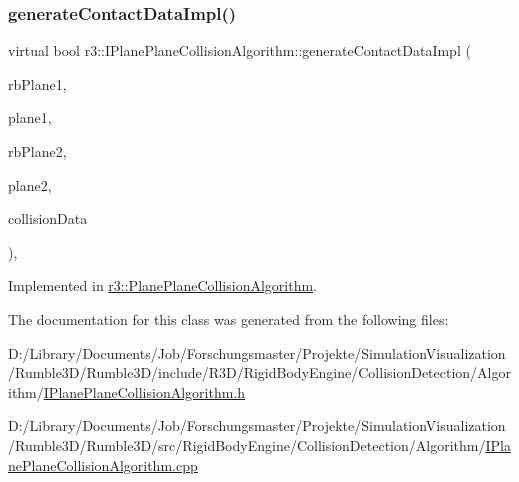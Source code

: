 \mbox{\label{classr3_1_1_i_plane_plane_collision_algorithm_a708dec70f58b4476976dfea9921d1524}} 
\subsubsection{\texorpdfstring{generate\+Contact\+Data\+Impl()}{generateContactDataImpl()}}
{\footnotesize\ttfamily virtual bool r3\+::\+I\+Plane\+Plane\+Collision\+Algorithm\+::generate\+Contact\+Data\+Impl (\begin{DoxyParamCaption}\item[{\mbox{\hyperlink{classr3_1_1_rigid_body}{Rigid\+Body}} $\ast$}]{rb\+Plane1,  }\item[{\mbox{\hyperlink{classr3_1_1_collision_plane}{Collision\+Plane}} $\ast$}]{plane1,  }\item[{\mbox{\hyperlink{classr3_1_1_rigid_body}{Rigid\+Body}} $\ast$}]{rb\+Plane2,  }\item[{\mbox{\hyperlink{classr3_1_1_collision_plane}{Collision\+Plane}} $\ast$}]{plane2,  }\item[{\mbox{\hyperlink{classr3_1_1_collision_data}{Collision\+Data}} \&}]{collision\+Data }\end{DoxyParamCaption})\hspace{0.3cm}{\ttfamily [protected]}, {}}



Implemented in \mbox{\hyperlink{classr3_1_1_plane_plane_collision_algorithm_a33400ba57a8c0550ada0778bb92eeb69}{r3\+::\+Plane\+Plane\+Collision\+Algorithm}}.



The documentation for this class was generated from the following files\+:\begin{DoxyCompactItemize}
\item 
D\+:/\+Library/\+Documents/\+Job/\+Forschungsmaster/\+Projekte/\+Simulation\+Visualization/\+Rumble3\+D/\+Rumble3\+D/include/\+R3\+D/\+Rigid\+Body\+Engine/\+Collision\+Detection/\+Algorithm/\mbox{\hyperlink{_i_plane_plane_collision_algorithm_8h}{I\+Plane\+Plane\+Collision\+Algorithm.\+h}}\item 
D\+:/\+Library/\+Documents/\+Job/\+Forschungsmaster/\+Projekte/\+Simulation\+Visualization/\+Rumble3\+D/\+Rumble3\+D/src/\+Rigid\+Body\+Engine/\+Collision\+Detection/\+Algorithm/\mbox{\hyperlink{_i_plane_plane_collision_algorithm_8cpp}{I\+Plane\+Plane\+Collision\+Algorithm.\+cpp}}\end{DoxyCompactItemize}
